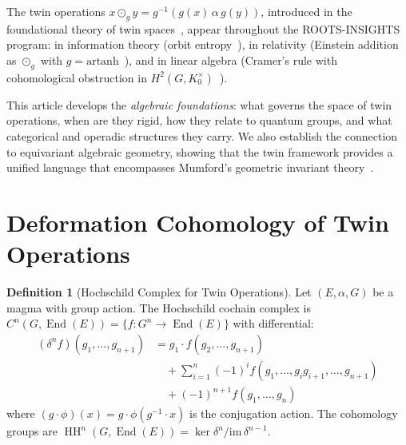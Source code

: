 \documentclass[11pt,twocolumn]{article}
\theoremstyle{plain}\newtheorem{theorem}{Theorem}\newtheorem{proposition}[theorem]{Proposition}\newtheorem{corollary}[theorem]{Corollary}\newtheorem{lemma}[theorem]{Lemma}
\theoremstyle{definition}\newtheorem{definition}[theorem]{Definition}\newtheorem{example}[theorem]{Example}
\theoremstyle{remark}\newtheorem{remark}[theorem]{Remark}
\newcommand{\HH}{\operatorname{HH}}
\newcommand{\End}{\operatorname{End}}
\begin{document}
The twin operations $x \odot_g y = g^{-1}(g(x) \,\alpha\, g(y))$, introduced in the foundational theory of twin spaces~\cite{nembe2026vol1,nembe2026vol3}, appear throughout the ROOTS-INSIGHTS program: in information theory (orbit entropy~\cite{nembe2026vol16}), in relativity (Einstein addition as $\odot_g$ with $g = \mathrm{artanh}$~\cite{nembe2026vol17}), and in linear algebra (Cramer's rule with cohomological obstruction in $H^2(G, K_0^\times)$~\cite{nembe2026cramer}).

This article develops the \emph{algebraic foundations}: what governs the space of twin operations, when are they rigid, how they relate to quantum groups, and what categorical and operadic structures they carry. We also establish the connection to equivariant algebraic geometry, showing that the twin framework provides a unified language that encompasses Mumford's geometric invariant theory~\cite{mumford1965}.


\section{Deformation Cohomology of Twin Operations}
\label{sec:cohomology}

\begin{definition}[Hochschild Complex for Twin Operations]\label{def:hochschild}
Let $(E, \alpha, G)$ be a magma with group action. The Hochschild cochain complex is $C^n(G, \End(E)) = \{f: G^n \to \End(E)\}$ with differential:
\begin{align*}
(\delta^n f)(g_1, \ldots, g_{n+1}) &= g_1 \cdot f(g_2, \ldots, g_{n+1}) \\
&\quad + \sum_{i=1}^n (-1)^i f(g_1, \ldots, g_i g_{i+1}, \ldots, g_{n+1}) \\
&\quad + (-1)^{n+1} f(g_1, \ldots, g_n)
\end{align*}
where $(g \cdot \phi)(x) = g \cdot \phi(g^{-1} \cdot x)$ is the conjugation action. The cohomology groups are $\HH^n(G, \End(E)) = \ker\delta^n / \mathrm{im}\,\delta^{n-1}$.
\end{definition}
\end{document}
